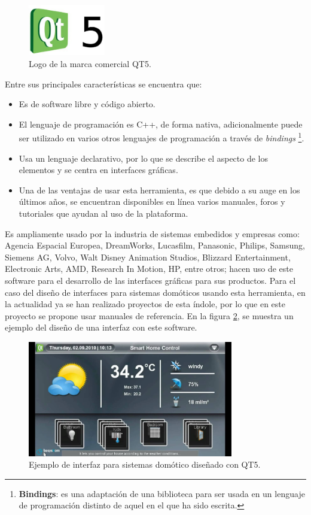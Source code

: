 \begin{figure}[H]
\centering
\includegraphics[width=0.3\textwidth]{./imagenes/teoria/qt5.jpg} 
\caption{Logo de la marca comercial QT5. \cite{QT52018}}
\label{F:qt5}
\end{figure}

Entre sus principales características se encuentra que:

\begin{itemize}
\item Es de software libre y código abierto.
\item El lenguaje de programación es C++, de forma nativa, adicionalmente puede ser utilizado en varios otros lenguajes de programación a través de \textit{bindings} \footnote{\textbf{Bindings}: es una adaptación de una biblioteca para ser usada en un lenguaje de programación distinto de aquel en el que ha sido escrita.}.
\item Usa un lenguaje declarativo, por lo que se describe el aspecto de los elementos y se centra en interfaces gráficas.
\item Una de las ventajas de usar esta herramienta, es que debido a su auge en los últimos años, se encuentran disponibles en línea varios manuales, foros y tutoriales que ayudan al uso de la plataforma. 
\end{itemize}

Es ampliamente usado por la industria de sistemas embedidos y empresas como: Agencia Espacial Europea, DreamWorks, Lucasfilm, Panasonic, Philips, Samsung, Siemens AG, Volvo, Walt Disney Animation Studios, Blizzard Entertainment, Electronic Arts, AMD, Research In Motion, HP, entre otros; hacen uso de este software para el desarrollo de las interfaces gráficas para sus productos. Para el caso del diseño de interfaces para sistemas domóticos usando esta herramienta, en la actualidad ya se han realizado proyectos de esta índole, por lo que en este proyecto se propone usar manuales de referencia. En la figura \ref{F:homeqt5}, se muestra un ejemplo del diseño de una interfaz con este software.

\begin{figure}[H]
\centering
\includegraphics[width=0.8\textwidth]{./imagenes/teoria/homeqt.jpg} 
\caption{Ejemplo de interfaz para sistemas domótico diseñado con QT5. \cite{QT52018}}
\label{F:homeqt5}
\end{figure}



